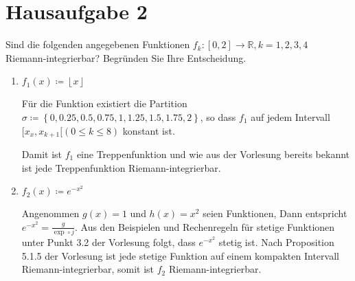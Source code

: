 \documentclass{article}
\begin{document}
\section*{Hausaufgabe 2}

Sind die folgenden angegebenen Funktionen
$f_k \colon [0, 2] \to \mathbb{R}, k = 1, 2, 3, 4$ Riemann-integrierbar?
Begründen Sie Ihre Entscheidung.

\begin{enumerate}
\item $f_1(x) \coloneqq \left\lfloor x \right\rfloor$
  

  Für die Funktion existiert die Partition
  $\sigma \coloneqq \left\{ 0, 0.25, 0.5, 0.75, 1, 1.25, 1.5, 1.75, 2 \right\}$,
  so dass $f_1$ auf jedem Intervall $[x_x, x_{k + 1}[ (0 \leq k \leq 8)$
  konstant ist.

  Damit ist $f_1$ eine Treppenfunktion und wie aus der Vorlesung bereits
  bekannt ist jede Treppenfunktion Riemann-integrierbar.
  
\item $f_2(x) \coloneqq e^{-x^2}$


  Angenommen $g(x) = 1$ und $h(x) = x^2$ seien Funktionen,
  Dann entspricht $e^{-x^2} = \frac{g}{\exp \circ j}$.
  Aus den Beispielen und Rechenregeln für stetige Funktionen unter Punkt
  3.2 der Vorlesung folgt, dass $e^{-x^2}$ stetig ist.
  Nach Proposition 5.1.5 der Vorlesung ist jede stetige Funktion auf einem
  kompakten Intervall Riemann-integrierbar, somit ist $f_2$ Riemann-integrierbar.
  
\end{enumerate}
\end{document}
